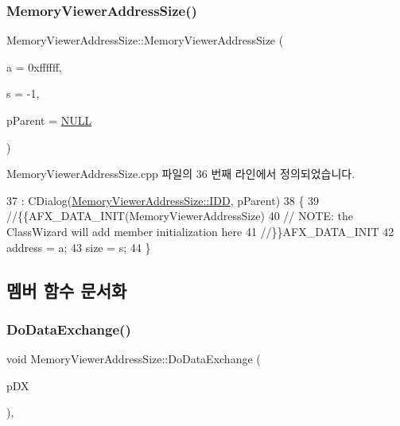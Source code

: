 \subsubsection{\texorpdfstring{Memory\+Viewer\+Address\+Size()}{MemoryViewerAddressSize()}}
{\footnotesize\ttfamily Memory\+Viewer\+Address\+Size\+::\+Memory\+Viewer\+Address\+Size (\begin{DoxyParamCaption}\item[{\mbox{\hyperlink{_system_8h_a10e94b422ef0c20dcdec20d31a1f5049}{u32}}}]{a = {\ttfamily 0xffffff},  }\item[{\mbox{\hyperlink{_util_8cpp_a0ef32aa8672df19503a49fab2d0c8071}{int}}}]{s = {\ttfamily -\/1},  }\item[{C\+Wnd $\ast$}]{p\+Parent = {\ttfamily \mbox{\hyperlink{_system_8h_a070d2ce7b6bb7e5c05602aa8c308d0c4}{N\+U\+LL}}} }\end{DoxyParamCaption})}



Memory\+Viewer\+Address\+Size.\+cpp 파일의 36 번째 라인에서 정의되었습니다.


\begin{DoxyCode}
37   : CDialog(\mbox{\hyperlink{class_memory_viewer_address_size_a20a7438413cb28be1f8a838f6f07dd1aaf952aee8c8eac701dc1be256e60f4753}{MemoryViewerAddressSize::IDD}}, pParent)
38 \{
39   \textcolor{comment}{//\{\{AFX\_DATA\_INIT(MemoryViewerAddressSize)}
40   \textcolor{comment}{// NOTE: the ClassWizard will add member initialization here}
41   \textcolor{comment}{//\}\}AFX\_DATA\_INIT}
42   address = a;
43   size = s;
44 \}
\end{DoxyCode}


\subsection{멤버 함수 문서화}
\mbox{\label{class_memory_viewer_address_size_a5b80a5682982a31e25469c1ba9d75ee8}} 
\subsubsection{\texorpdfstring{Do\+Data\+Exchange()}{DoDataExchange()}}
{\footnotesize\ttfamily void Memory\+Viewer\+Address\+Size\+::\+Do\+Data\+Exchange (\begin{DoxyParamCaption}\item[{C\+Data\+Exchange $\ast$}]{p\+DX }\end{DoxyParamCaption})\hspace{0.3cm}{\ttfamily [protected]}, {\ttfamily [virtual]}}



